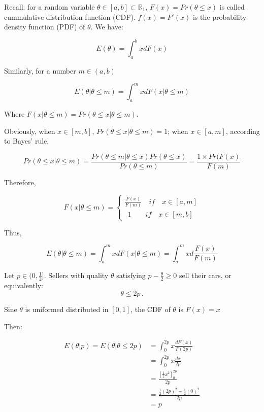 \documentclass{article}
\newcommand{\R}{\mathbb{R}}
\begin{document}
\begin{mdframed}[backgroundcolor=blue!20,linecolor=white]

Recall: for a random variable $\theta \in [a,b] \subset \R_1$, $F(x) = Pr(\theta\le x)$ is called cummulative distribution function (CDF). $f(x)=F'(x)$ is the probability density function (PDF) of $\theta$. We have:

$$E(\theta) = \int^b_a x dF(x)$$

Similarly, for a number $m \in (a,b)$

$$E(\theta|\theta \le m) = \int^m_a x d F(x|\theta \le m)$$

Where $F(x|\theta \le m) = Pr(\theta \le x | \theta \le m)$. 

\medskip 

Obviously, when $x \in [m,b]$, $Pr(\theta \le x | \theta \le m)=1$; when $x \in [a,m]$, according to Bayes' rule,


 $$Pr(\theta \le x | \theta \le m)= \frac{Pr(\theta \le m | \theta \le x) Pr(\theta \le x)}{Pr(\theta \le m)} = \frac{1 \times Pr(F(x)}{F(m)}$$

Therefore,

\begin{equation}
F(x|\theta \le m)=
    \begin{cases}
\frac{F(x)}{F(m)} \quad if \quad x \in [a,m] \\
\ \ 1 \quad \quad if \quad x \in [m,b] 
    \end{cases}
\nonumber
\end{equation}

Thus,

$$E(\theta|\theta \le m) = \int^m_a x d F(x|\theta \le m)=\int^m_a x d \frac{F(x)}{F(m)}$$
\end{mdframed}

Let $p \in (0,\tfrac12]$. Sellers with quality $\theta$ satisfying $p - \tfrac{\theta}2 \geq 0$ sell their cars, or equivalently:$$\theta \leq 2p \, .$$

\medskip

Sine $\theta$ is uniformed distributed in $[0,1]$, the CDF of $\theta$ is $F(x) = x$

\medskip

Then:

\begin{align*}
E(\theta | p) = E(\theta | \theta \leq 2p) &= \int_{0}^{2p}x\frac{dF(x)}{F(2p)} \\
&= \int_{0}^{2p} x\frac{dx}{2p} \\
&= \frac{\left[ \tfrac12 x^2 \right]^{2p}_0}{2p} \\
&= \frac{\tfrac12 (2p)^2 - \tfrac12 (0)^2}{2p} \\
&= p
\end{align*}
\end{document}

